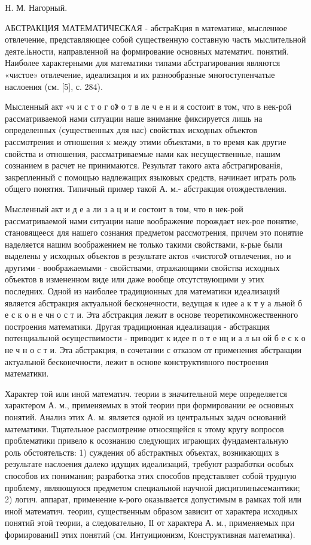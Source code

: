 \documentclass[10pt]{article}
\begin{document}
H. М. Нагорный.



АБСТРАКЦИЯ МАТЕМАТИЧЕСКАЯ - абстраКция в математике, мысленное отвлечение, представляющее собой существенную составную часть мыслительной деяте.іьности, направленной на формирование основных математич. понятий. Наиболее характерными для математики типами абстрагирования являются «чистое» отвлечение, идеализация и их разнообразные многоступенчатые наслоения (см. [5], с. 284).



Мысленный акт «ч и с т о г о》 о т в ле ч е н и я состоит в том, что в нек-рой рассматриваемой нами ситуации наше внимание фиксируется лишь на определенных (существенных для нас) свойствах исходных объектов рассмотрения и отношения $\mathrm{x}$ между этими объектами, в то время как другие свойства и отношения, рассматриваемые нами как несущественные, нашим сознанием в расчет не принимаются. Результат такого акта абстрагированія, закрепленный с помощью надлежащих языковых средств, начинает играть роль общего понятия. Типичный пример такой А. м.- абстракция отождествления.



Мысленный акт и д е а ли з а ц и и состоит в том, что в нек-рой рассматриваемой нами ситуации наше воображение порождает нек-рое понятие, становящееся для нашего сознания предметом рассмотрения, причем это понятие наделяется нашим воображением не только такими свойствами, к-рые были выделены у исходных объектов в результате актов «чистого》 отвлечения, но и другими - воображаемыми - свойствами, отражающими свойства исходных объектов в измененном виде или даже вообще отсутствующими у этих последних. Одной из наиболее традиционных для математики идеализаций является абстракция актуальной бесконечности, ведущая к идее а к т у а льной б е с к о н е чн о с т и. Эта абстракция лежит в основе теоретикомножественного построения математики. Другая традиционная идеализация - абстракция потенциальной осуществимости - приводит к идее п о т е нц и а л ьн ой б е с к о не ч н о с т и. Эта абстракция, в сочетании с отказом от применения абстракции актуальной бесконечности, лежит в основе конструктивного построения математики.



Характер той или иной математич. теории в значительной мере определяется характером А. м., применяемых в этой теории при формировании ее основных понятий. Анализ этих А. м. является одной из центральных задач оснований математики. Тщательное рассмотрение относящейся к этому кругу вопросов проблематики привело к осознанию следующих играющих фундаментальную роль обстоятельств: 1) суждения об абстрактных объектах, возникающих в результате наслоения далеко идущих идеализаций, требуют разработки особых способов их понимания; разработка этих способов представляет собой трудную проблему, являющуюся предметом специальной научной дисциплинысемантики; 2) логич. аппарат, применение к-рого оказывается допустимым в рамках той или иной математич. теории, существенным образом зависит от характера исходных понятий этой теории, а следовательно, ІІ от характера А. м., применяемых при формированиІІ этих понятий (см. Интуиционизм, Конструктивная математика).
\end{document}
